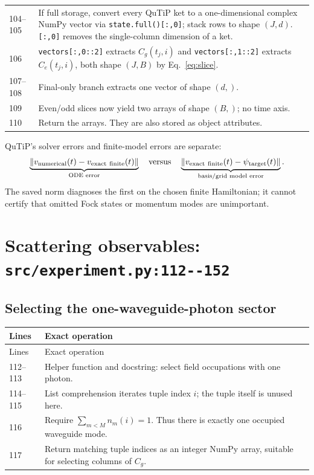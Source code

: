 \documentclass[11pt,a4paper]{article}
\newcommand{\code}[1]{\nolinkurl{#1}}
\begin{document}
\begin{longtable}{p{}p{}}
104--105 & If full storage, convert every QuTiP ket to a one-dimensional complex NumPy vector via \code{state.full()[:,0]}; stack rows to shape $(J,d)$. \code{[:,0]} removes the single-column dimension of a ket.\\
106 & \code{vectors[:,0::2]} extracts $C_g(t_j,i)$ and \code{vectors[:,1::2]} extracts $C_e(t_j,i)$, both shape $(J,B)$ by Eq.~\eqref{eq:slice}.\\
107--108 & Final-only branch extracts one vector of shape $(d,)$.\\
109 & Even/odd slices now yield two arrays of shape $(B,)$; no time axis.\\
110 & Return the arrays. They are also stored as object attributes.\\
\bottomrule
\end{longtable}
QuTiP's solver errors and finite-model errors are separate:
\[
\underbrace{\|v_{\rm numerical}(t)-v_{\rm exact\ finite}(t)\|}_{\text{ODE error}}
\quad\text{versus}\quad
\underbrace{\|v_{\rm exact\ finite}(t)-\psi_{\rm target}(t)\|}_{\text{basis/grid model error}}.
\]
The saved norm diagnoses the first on the chosen finite Hamiltonian; it cannot
certify that omitted Fock states or momentum modes are unimportant.

\section{Scattering observables: \code{src/experiment.py:112--152}}
\subsection{Selecting the one-waveguide-photon sector}

\begin{longtable}{p{}p{}}
\toprule Lines & Exact operation\\\midrule\endfirsthead
\toprule Lines & Exact operation\\\midrule\endhead
112--113 & Helper function and docstring: select field occupations with one photon.\\
114--115 & List comprehension iterates tuple index $i$; the tuple itself is unused here.\\
116 & Require $\sum_{m<M}n_m(i)=1$. Thus there is exactly one occupied waveguide mode.\\
117 & Return matching tuple indices as an integer NumPy array, suitable for selecting columns of $C_g$.\\
\bottomrule
\end{longtable}
\end{document}
